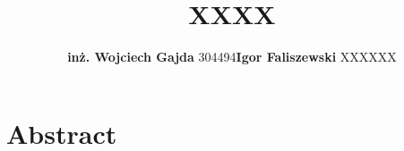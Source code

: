 \documentclass[15pt]{sprawozdanie}
\title{XXXX}
\author{\textbf{inż. Wojciech Gajda} 304494\vspace{20pt}\textbf{Igor Faliszewski} XXXXXX}
\begin{document}
\maketitle

\tableofcontents
\newpage

\section{Abstract}
\end{document}
